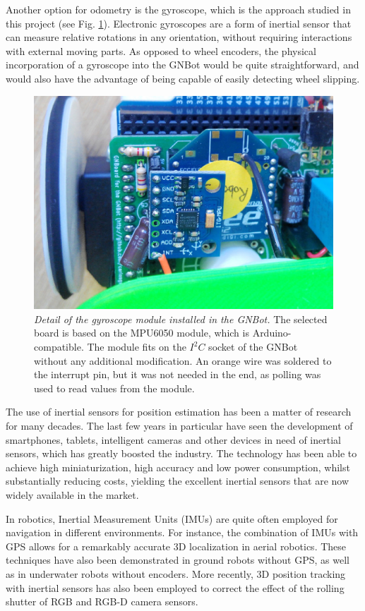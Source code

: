 \documentclass[12pt,twoside]{report}
\begin{document}
Another option for odometry is the gyroscope, which is the approach studied in this project (see Fig. \ref{fig:GNBotGyro}). Electronic gyroscopes are a form of inertial sensor that can measure relative rotations in any orientation, without requiring interactions with external moving parts. As opposed to wheel encoders, the physical incorporation of a gyroscope into the GNBot would be quite straightforward, and would also have the advantage of being capable of easily detecting wheel slipping.



\begin{figure}[hbtp]
\centerline{
\includegraphics[width=0.62\linewidth]{GNBot_gyro}}
\caption[Detail of the gyroscope module installed in the GNBot]{\emph{Detail of the gyroscope module installed in the GNBot.} The selected board is based on the MPU6050 module, which is Arduino-compatible. The module fits on the $I^2C$ socket of the GNBot without any additional modification.
An orange wire was soldered to the interrupt pin, but it was not needed in the end, as polling was used to read values from the module.
}
\label{fig:GNBotGyro}
\end{figure}



The use of inertial sensors for position estimation has been a matter of research for many decades. The last few years in particular have seen the development of smartphones, tablets, intelligent cameras and other devices in need of inertial sensors, which has greatly boosted the industry. The technology has been able to achieve high miniaturization, high accuracy and low power consumption, whilst substantially reducing costs, yielding the excellent inertial sensors that are now widely available in the market.



In robotics, Inertial Measurement Units (IMUs) are quite often employed for navigation in different environments.
For instance, the combination of IMUs with GPS allows for a remarkably accurate 3D localization in aerial robotics\cite{Barczyk10}. These techniques have also been demonstrated in ground robots without GPS\cite{PeiChunLin06,SeungbeomWoo11}, as well as in underwater robots without encoders\cite{Stilwell01,Kinsey02,Panish11}.
More recently, 3D position tracking with inertial sensors has also been employed to correct the effect of the rolling shutter of RGB\cite{HyoungKiLee12} and RGB-D\cite{Ovren13} camera sensors.
\end{document}
